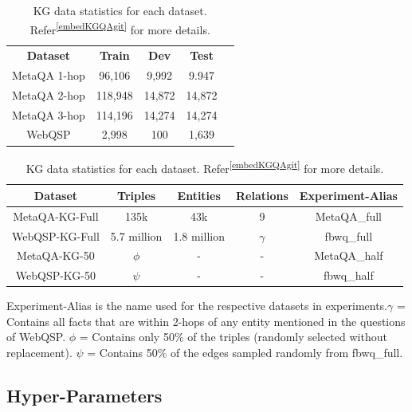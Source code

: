 \begin{table}[]
\centering
\small
\begin{tabular}{c|c|c|cc}
\cline{1-4}
\textbf{Dataset} & \textbf{Train} & \textbf{Dev} & \textbf{Test} & \textbf{} \\ \cline{1-4}
MetaQA 1-hop     & 96,106         & 9,992        & 9.947         &           \\ \cline{1-4}
MetaQA 2-hop     & 118,948        & 14,872       & 14,872        &           \\ \cline{1-4}
MetaQA 3-hop     & 114,196        & 14,274       & 14,274        &           \\ \cline{1-4}
WebQSP           & 2,998          & 100          & 1,639         &           \\ \cline{1-4}
\end{tabular}
\caption{QA data statistics for each dataset according to \cite{saxena-etal-2020-improving}}
\label{dataset-qa-stats}

\begin{tabular}{c|c|c|c|c}
\hline
\textbf{Dataset} & \textbf{Triples} & \textbf{Entities} & \textbf{Relations} & \textbf{Experiment-Alias} \\ \hline
MetaQA-KG-Full   & 135k             & 43k               & 9                  & MetaQA\_full              \\ \hline
WebQSP-KG-Full   & 5.7 million      & 1.8 million       & $\gamma$           & fbwq\_full                \\ \hline
MetaQA-KG-50     & $\phi$           & -                 & -                  & MetaQA\_half              \\ \hline
WebQSP-KG-50     & $\psi$           & -                 & -                  & fbwq\_half                \\ \hline
\end{tabular}
\caption{KG data statistics for each dataset. Refer\textsuperscript{\ref{embedKGQAgit}} for more details.}Experiment-Alias is the name used for the respective datasets in experiments.\newline$\gamma$ = Contains all facts that are within 2-hops of any entity mentioned in the questions of WebQSP. \newline $\phi$ = Contains only 50\% of the triples (randomly selected without replacement). \newline $\psi$ = Contains 50\% of the edges sampled randomly from fbwq\_full.
\label{dataset-kg-stats}
\end{table}
\subsection{Hyper-Parameters}\label{sec:hyperparams}

